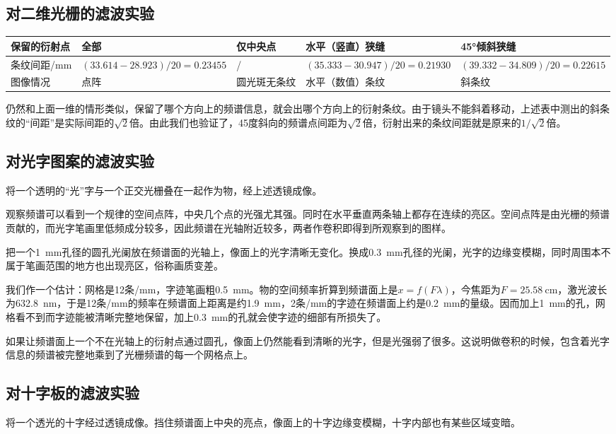 \documentclass[UTF8]{ctexart}
\begin{document}
\subsection{对二维光栅的滤波实验}
\begin{center}
\begin{tabu}{X[c,-10]|X[c,-10]X[c,-10]X[c,-10]X[c,-10]}
\hline
保留的衍射点&全部&仅中央点&水平（竖直）狭缝&45°倾斜狭缝\\
\hline
条纹间距/mm&$(33.614-28.923)/20=0.23455$&/&$(35.333-30.947)/20=0.21930$&$(39.332-34.809)/20=0.22615$\\
图像情况&点阵&圆光斑无条纹&水平（数值）条纹&斜条纹\\
\hline
\end{tabu}
\end{center}
仍然和上面一维的情形类似，保留了哪个方向上的频谱信息，就会出哪个方向上的衍射条纹。由于镜头不能斜着移动，上述表中测出的斜条纹的“间距”是实际间距的$\sqrt{2}$倍。由此我们也验证了，45度斜向的频谱点间距为$\sqrt{2}$倍，衍射出来的条纹间距就是原来的$1/\sqrt{2}$倍。
\subsection{对光字图案的滤波实验}
将一个透明的“光”字与一个正交光栅叠在一起作为物，经上述透镜成像。

观察频谱可以看到一个规律的空间点阵，中央几个点的光强尤其强。同时在水平垂直两条轴上都存在连续的亮区。空间点阵是由光栅的频谱贡献的，而光字笔画里低频成分较多，因此频谱在光轴附近较多，两者作卷积即得到所观察到的图样。

把一个\SI{1}{\mm}孔径的圆孔光阑放在频谱面的光轴上，像面上的光字清晰无变化。换成\SI{.3}{\mm}孔径的光阑，光字的边缘变模糊，同时周围本不属于笔画范围的地方也出现亮区，俗称画质变差。

我们作一个估计：网格是12条/mm，字迹笔画粗\SI{.5}{\mm}。物的空间频率折算到频谱面上是$x=f(F\lambda)$，今焦距为$F=\SI{25.58}{\cm}$，激光波长为\SI{632.8}{\nm}，于是12条/mm的频率在频谱面上距离是约\SI{1.9}{\mm}，2条/mm的字迹在频谱面上约是\SI{.2}{\mm}的量级。因而加上\SI{1}{\mm}的孔，网格看不到而字迹能被清晰完整地保留，加上\SI{.3}{\mm}的孔就会使字迹的细部有所损失了。

如果让频谱面上一个不在光轴上的衍射点通过圆孔，像面上仍然能看到清晰的光字，但是光强弱了很多。这说明做卷积的时候，包含着光字信息的频谱被完整地乘到了光栅频谱的每一个网格点上。
\subsection{对十字板的滤波实验}
将一个透光的十字经过透镜成像。挡住频谱面上中央的亮点，像面上的十字边缘变模糊，十字内部也有某些区域变暗。
\end{document}
